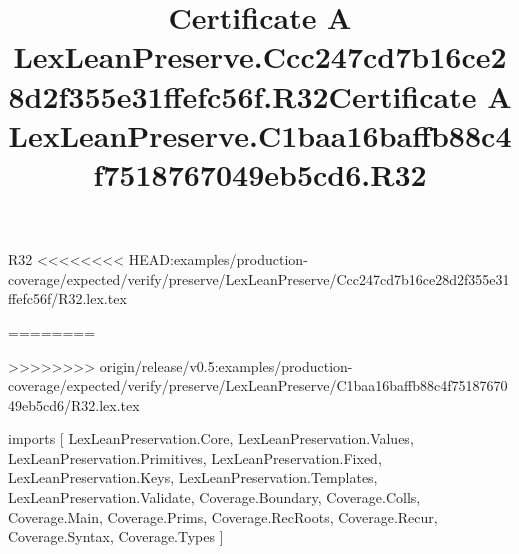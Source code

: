 \begin{lexlean}{R32}
<<<<<<<< HEAD:examples/production-coverage/expected/verify/preserve/LexLeanPreserve/Ccc247cd7b16ce28d2f355e31ffefc56f/R32.lex.tex
\title{Certificate A LexLeanPreserve.Ccc247cd7b16ce28d2f355e31ffefc56f.R32}
========
\title{Certificate A LexLeanPreserve.C1baa16baffb88c4f7518767049eb5cd6.R32}
>>>>>>>> origin/release/v0.5:examples/production-coverage/expected/verify/preserve/LexLeanPreserve/C1baa16baffb88c4f7518767049eb5cd6/R32.lex.tex
\begin{coremodule}
imports [
  LexLeanPreservation.Core,
  LexLeanPreservation.Values,
  LexLeanPreservation.Primitives,
  LexLeanPreservation.Fixed,
  LexLeanPreservation.Keys,
  LexLeanPreservation.Templates,
  LexLeanPreservation.Validate,
  Coverage.Boundary,
  Coverage.Colls,
  Coverage.Main,
  Coverage.Prims,
  Coverage.RecRoots,
  Coverage.Recur,
  Coverage.Syntax,
  Coverage.Types
]


\end{coremodule}
\end{lexlean}
